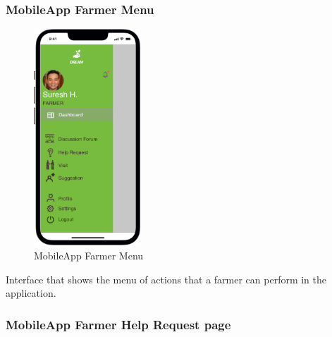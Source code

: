 \subsubsection{MobileApp Farmer Menu}

\begin{figure}[H]
  \centering
     \includegraphics[width=40mm,scale=0.9]{./Images//Mocks/Mobile/Farmer_menu.png}
     \caption{MobileApp Farmer Menu}
\end{figure}

Interface that shows the menu of actions that a farmer can perform in the application.\\

\subsubsection{MobileApp Farmer Help Request page}


